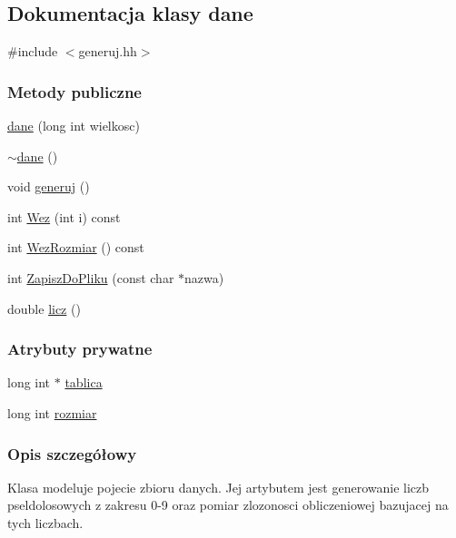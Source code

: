 \hypertarget{classdane}{}\subsection{Dokumentacja klasy dane}
\label{classdane}


{\ttfamily \#include $<$generuj.\+hh$>$}

\subsubsection*{Metody publiczne}
\begin{DoxyCompactItemize}
\item 
\hyperlink{classdane_a343d935dd2271b07694c830de41a3479}{dane} (long int wielkosc)
\item 
\hyperlink{classdane_ae013323d9e999cb4bd3a7fdbf51c4401}{$\sim$dane} ()
\item 
void \hyperlink{classdane_a3c63af736de15303e468404b892ff749}{generuj} ()
\item 
int \hyperlink{classdane_a9ae56a861bc8e17b33eaa92feba8fab7}{Wez} (int i) const 
\item 
int \hyperlink{classdane_a86a56a87d2cb77716fae2e0ff753ef82}{Wez\+Rozmiar} () const 
\item 
int \hyperlink{classdane_a97c3ef4d2c3cde0e701e30122c8c22fc}{Zapisz\+Do\+Pliku} (const char $\ast$nazwa)
\item 
double \hyperlink{classdane_ad217ab46050e5f3a16d92e69056e75f4}{licz} ()
\end{DoxyCompactItemize}
\subsubsection*{Atrybuty prywatne}
\begin{DoxyCompactItemize}
\item 
long int $\ast$ \hyperlink{classdane_a99cb90f61c23e390b594c688bd52ebf5}{tablica}
\item 
long int \hyperlink{classdane_abc9b63b1b2caa22fd4c71a8504d01ae6}{rozmiar}
\end{DoxyCompactItemize}


\subsubsection{Opis szczegółowy}
Klasa modeluje pojecie zbioru danych. Jej artybutem jest generowanie liczb pseldolosowych z zakresu 0-\/9 oraz pomiar zlozonosci obliczeniowej bazujacej na tych liczbach. 

